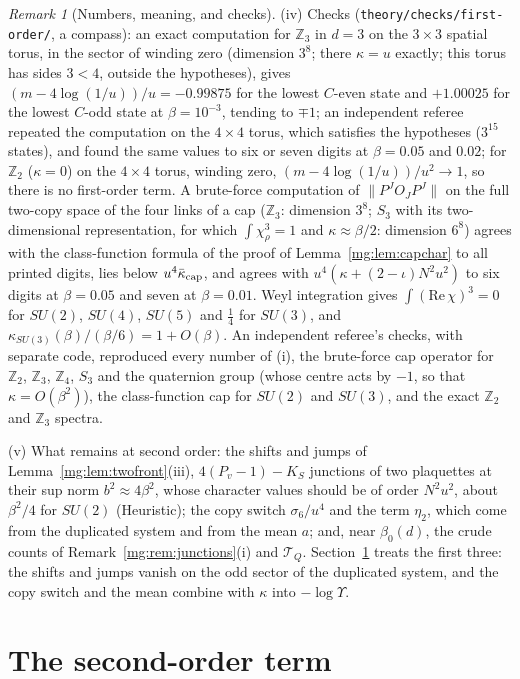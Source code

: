 \documentclass[11pt,a4paper]{article}
\theoremstyle{definition}
\theoremstyle{remark}
\newtheorem{remark}[theorem]{Remark}
\newcommand{\norm}[1]{\lVert #1\rVert}
\begin{document}
\begin{remark}[Numbers, meaning, and checks]
(iv) Checks (\texttt{theory/checks/first-order/}, a compass): an exact computation for $\mathbb Z_3$ in $d=3$ on the $3\times3$ spatial torus, in the sector
of winding zero (dimension $3^8$; there $\kappa=u$ exactly; this torus has sides $3<4$, outside the hypotheses), gives $(m-4\log(1/u))/u=-0.99875$ for the lowest $C$-even state and $+1.00025$ for the lowest
$C$-odd state at $\beta=10^{-3}$, tending to $\mp1$; an independent referee repeated the computation on the $4\times4$ torus, which satisfies the
hypotheses ($3^{15}$ states), and found the same values to six or seven digits at $\beta=0.05$ and $0.02$; for $\mathbb Z_2$ ($\kappa=0$) on the $4\times4$ torus, winding zero, $(m-4\log(1/u))/u^2\to1$, so there
is no first-order term. A brute-force computation of $\norm{P^JO_JP^J}$ on the full two-copy space of the four links of a cap
($\mathbb Z_3$: dimension $3^8$; $S_3$ with its two-dimensional representation, for which $\int\chi_\rho^3=1$ and $\kappa\approx\beta/2$: dimension $6^8$)
agrees with the class-function formula of the proof of Lemma~\ref{mg:lem:capchar} to all printed digits, lies below $u^4\bar\kappa_{\rm cap}$, and agrees with
$u^4(\kappa+(2-\iota)N^2u^2)$ to six digits at $\beta=0.05$ and seven at $\beta=0.01$. Weyl integration gives $\int(\mathrm{Re}\,\chi)^3=0$ for $SU(2)$, $SU(4)$, $SU(5)$ and $\frac14$ for $SU(3)$, and
$\kappa_{SU(3)}(\beta)/(\beta/6)=1+O(\beta)$. An independent referee's checks, with separate code, reproduced every number of (i), the brute-force cap operator for
$\mathbb Z_2$, $\mathbb Z_3$, $\mathbb Z_4$, $S_3$ and the quaternion group (whose centre acts by $-1$, so that $\kappa=O(\beta^2)$), the class-function
cap for $SU(2)$ and $SU(3)$, and the exact $\mathbb Z_2$ and $\mathbb Z_3$ spectra.

(v) What remains at second order: the shifts and jumps of Lemma~\ref{mg:lem:twofront}(iii), $4(P_v-1)-K_S$ junctions of two plaquettes at their sup norm
$b^2\approx4\beta^2$, whose character values should be of order $N^2u^2$, about $\beta^2/4$ for $SU(2)$ (Heuristic); the copy switch $\sigma_6/u^4$ and the term $\eta_2$, which come
from the duplicated system and from the mean $a$; and, near $\beta_0(d)$, the crude counts of Remark~\ref{mg:rem:junctions}(i) and $\mathcal T_Q$.
Section~\ref{mg:sec:second} treats the first three: the shifts and jumps vanish on the odd sector of the duplicated system, and the copy switch and the
mean combine with $\kappa$ into $-\log\Upsilon$.
\end{remark}

\section{The second-order term}\label{mg:sec:second}
\end{document}
